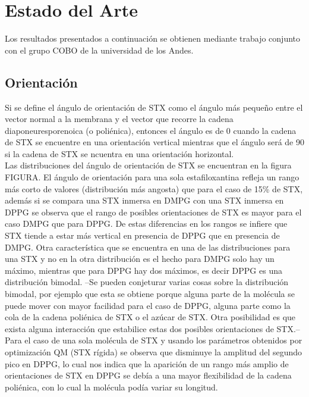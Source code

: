 \chapter{Estado del Arte}
Los resultados presentados a continuaci\'{o}n se obtienen mediante trabajo conjunto con el grupo COBO de la universidad de los Andes.\\

\section{Orientaci\'{o}n}
Si se define el \'{a}ngulo de orientaci\'{o}n de STX como el \'{a}ngulo m\'{a}s peque\~{n}o entre el vector normal a la membrana y el vector que recorre la cadena diaponeuresporenoica (o poli\'{e}nica), entonces el \'{a}ngulo es de 0 \textdegree cuando la cadena de STX se encuentre en una orientaci\'{o}n vertical mientras que el \'{a}ngulo ser\'{a} de 90 \textdegree si  la cadena de STX se ncuentra en una orientaci\'{o}n horizontal.\\
Las distribuciones del \'{a}ngulo de orientaci\'{o}n de STX se encuentran en la figura FIGURA. El \'{a}ngulo de orientaci\'{o}n para una sola estafiloxantina refleja un rango m\'{a}s corto de valores (distribuci\'{o}n m\'{a}s angosta) que para el caso de 15\% de STX, adem\'{a}s si se compara una STX inmersa en DMPG con una STX inmersa en DPPG se observa que el rango de posibles orientaciones de STX es mayor para el caso DMPG que para DPPG. De estas diferencias en los rangos se infiere que STX tiende a estar m\'{a}s vertical en presencia de DPPG que en presencia de DMPG. Otra caracter\'{i}stica que se encuentra en una de las distribuciones para una STX y no en la otra distribuci\'{o}n es el hecho para DMPG solo hay un m\'{a}ximo, mientras que para DPPG hay dos m\'{a}ximos, es decir DPPG es una distribuci\'{o}n bimodal. --Se pueden conjeturar varias cosas sobre la distribuci\'{o}n bimodal, por ejemplo que esta se obtiene porque alguna parte de la mol\'{e}cula se puede mover con mayor facilidad para el caso de DPPG, alguna parte como la cola de la cadena poli\'{e}nica de STX o el az\'{u}car de STX. Otra posibilidad es que exista alguna interacci\'{o}n que estabilice estas dos posibles orientaciones de STX.--\\

Para el caso de una sola mol\'{e}cula de STX y usando los par\'{a}metros obtenidos por optimizaci\'{o}n QM (STX r\'{i}gida) se observa que disminuye la amplitud del segundo pico en DPPG, lo cual nos indica que la aparici\'{o}n de un rango m\'{a}s amplio de orientaciones de STX en DPPG se deb\'{i}a a una mayor flexibilidad de la cadena poli\'{e}nica, con lo cual la mol\'{e}cula pod\'{i}a variar su longitud.\\

